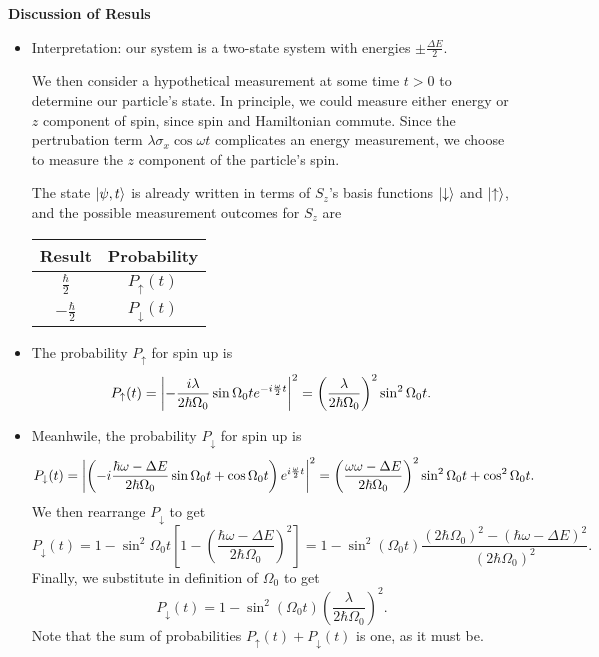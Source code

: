 \documentclass[11pt, a4paper]{article}
\newcommand{\Ham}{Hamiltonian\xspace}
\newcommand{\p}{\psi}  %
\newcommand{\ua}{\uparrow}  %
\newcommand{\da}{\downarrow}  %
\begin{document}
\textbf{Discussion of Resuls}
\begin{itemize}
	\item Interpretation: our system is a two-state system with energies $ \pm \frac{\Delta E}{2} $. 
	
	We then consider a hypothetical measurement at some time $ t > 0 $  to determine our particle's state. In principle, we could measure either energy or $ z $ component of spin, since spin and \Ham commute. Since the pertrubation term $ \lambda \sigma_{x} \cos \omega t $ complicates an energy measurement, we choose to measure the $ z $ component of the particle's spin.
	
    The state $ \ket{\p, t} $ is already written in terms of $ S_{z} $'s basis functions $ \ket{\da} $ and $ \ket{\ua} $, and the possible measurement outcomes for $ S_{z} $ are
	
	\begin{center}
		\begin{tabular}{c|c}
			Result & Probability \\
			\hline {\rule{0pt}{2.6ex}} \hspace{-7pt}
			 $ \frac{\hbar}{2} $ & $ P_{\ua}(t) $\\
			$ -\frac{\hbar}{2} $ & $ P_{\da}(t) $
		\end{tabular}
	\end{center}
	
	\item The probability $ P_{\ua} $ for spin up is
	\begin{equation*}
		P_{\ua}(t) = \abs{-\frac{i\lambda}{2\hbar \Omega_{0}} \sin \Omega_{0}t e^{-i\frac{\omega}{2}t}}^{2} = \left(\frac{\lambda}{2\hbar\Omega_{0}}\right)^{2}\sin^{2}\Omega_{0}t.
	\end{equation*}
	\item Meanhwile, the probability $ P_{\da} $ for spin up is
	\begin{equation*}
		P_{\da}(t) = \abs{\left(-i\frac{\hbar \omega - \Delta E}{2\hbar\Omega_{0}} \sin \Omega_{0}t + \cos \Omega_{0}t\right)e^{i\frac{\omega}{2}t} }^{2} = \left(\frac{\omega \omega - \Delta E}{2\hbar \Omega_{0}}\right)^{2}\sin^{2}\Omega_{0}t + \cos^{2}\Omega_{0}t.
	\end{equation*}
    We then rearrange $ P_{\da} $ to get
	\begin{equation*}
        P_{\da}(t) = 1 - \sin^{2}\Omega_{0}t\left[1 - \left(\frac{\hbar \omega - \Delta E}{2\hbar \Omega_{0}}\right)^{2}\right] = 1 - \sin^{2}(\Omega_{0}t)\frac{(2\hbar \Omega_{0})^{2} - (\hbar \omega - \Delta E)^{2}}{(2\hbar \Omega_{0})^{2}}.
	\end{equation*}
	Finally, we substitute in definition of $ \Omega_{0} $ to get
	\begin{equation*}
        P_{\da}(t) = 1 - \sin^{2}(\Omega_{0}t)\left(\frac{\lambda}{2\hbar \Omega_{0}}\right)^{2}.
	\end{equation*}
	Note that the sum of probabilities $ P_{\ua}(t) + P_{\da}(t) $ is one, as it must be.
	

\end{itemize}
\end{document}
